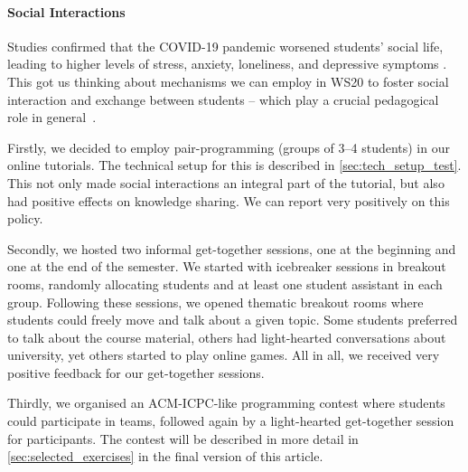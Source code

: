 \paragraph{Social Interactions}
Studies confirmed that the COVID-19 pandemic
worsened students' social life,
leading to higher levels of stress, anxiety, loneliness, and depressive symptoms \cite{students_lockdown1}.
This got us thinking about mechanisms we
can employ in WS20 to foster social interaction and exchange between students
-- which play a crucial pedagogical role in general~\cite{impact_social_interaction}.

Firstly, we decided to employ pair-programming (groups of 3--4 students)
in our online tutorials.
The technical setup for this is described in \cref{sec:tech_setup_test}.
This not only made social interactions an integral part of the tutorial,
but also had positive effects on knowledge sharing.
We can report very positively on this policy.

Secondly, we hosted two informal get-together sessions,
one at the beginning and one at the end of the semester.
We started with icebreaker sessions in breakout rooms,
randomly allocating students and at least one student assistant in each group.
Following these sessions,
we opened thematic breakout rooms where students
could freely move and talk about a given topic.
Some students preferred to talk about the course material, others had
light-hearted conversations about university, yet others started to play online games.
All in all, we received very positive feedback for our get-together sessions.

Thirdly, we organised an
ACM-ICPC-like programming contest
where students could participate in teams,
followed again by a light-hearted get-together session
for participants.
The contest will be described in more detail in \cref{sec:selected_exercises} in the final version of this article.
